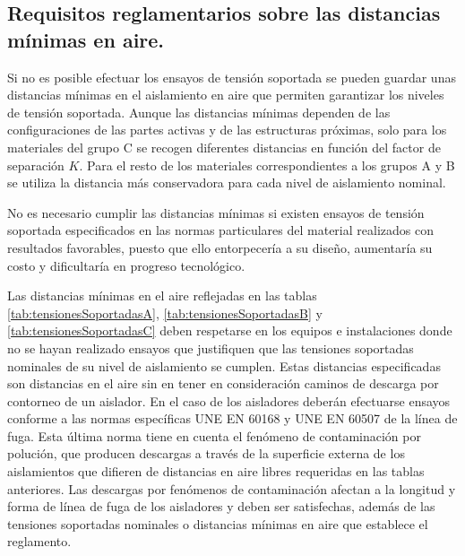         \subsection{Requisitos reglamentarios sobre las distancias mínimas en aire.}
            Si no es posible efectuar los ensayos de tensión soportada se pueden guardar unas distancias mínimas en el aislamiento en aire que permiten garantizar los niveles de tensión soportada. Aunque las distancias mínimas dependen de las configuraciones de las partes activas y de las estructuras próximas, solo para los materiales del grupo C se recogen diferentes distancias en función del factor de separación $K$. Para el resto de los materiales correspondientes a los grupos A y B se utiliza la distancia más conservadora para cada nivel de aislamiento nominal.\newline

            No es necesario cumplir las distancias mínimas si existen ensayos de tensión soportada especificados en las normas particulares del material realizados con resultados favorables, puesto que ello entorpecería a su diseño, aumentaría su costo y dificultaría en progreso tecnológico.\newline

            Las distancias mínimas en el aire reflejadas en las tablas \ref{tab:tensionesSoportadasA}, \ref{tab:tensionesSoportadasB} y \ref{tab:tensionesSoportadasC} deben respetarse en los equipos e instalaciones donde no se hayan realizado ensayos que justifiquen que las tensiones soportadas nominales de su nivel de aislamiento se cumplen. Estas distancias especificadas son distancias en el aire sin en tener en consideración caminos de descarga por contorneo de un aislador. En el caso de los aisladores deberán efectuarse ensayos conforme a las normas específicas UNE EN 60168 y UNE EN 60507 de la línea de fuga. Esta última norma tiene en cuenta el fenómeno de contaminación por polución, que producen descargas a través de la superficie externa de los aislamientos que difieren de distancias en aire libres requeridas en las tablas anteriores. Las descargas por fenómenos de contaminación afectan a la longitud y forma de línea de fuga de los aisladores y deben ser satisfechas, además de las tensiones soportadas nominales o distancias mínimas en aire que establece el reglamento.\newline

